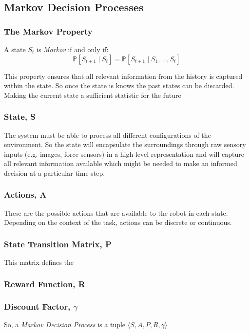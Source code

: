   \subsection{Markov Decision Processes}
    \subsubsection{The Markov Property}
      A state $S_t$ is \emph{Markov} if and only if:
      \[ 
        \mathbb{P} \left[S_{t+1} \mid S_t\right] = \mathbb{P}\left[ S_{t+1} \mid S_1, \ldots, S_t\right]
      \]

      This property ensures that all relevant information from the history is captured within the state. So once the state is knows the past states can be discarded. Making the current state a sufficient statistic for the future \cite{silver2015}

    \subsubsection{State, S}
      The system must be able to process all different configurations of the environment. So the state will encapsulate the surroundings through raw sensory inputs (e.g. images, force sensors) in a high-level representation and will capture all relevant information available \cite{Sutton1998} which might be needed to make an informed decision at a particular time step.
    
    \subsubsection{Actions, A}
      These are the possible actions that are available to the robot in each state. Depending on the context of the task, actions can be discrete or continuous.
    
    \subsubsection{State Transition Matrix, P}
      This matrix defines the 
    
    \subsubsection{Reward Function, R}
    
    \subsubsection{Discount Factor, $\gamma$} 


  So, a \emph{Markov Decision Process} is a tuple \(\langle S, A, P, R, \gamma \rangle\)